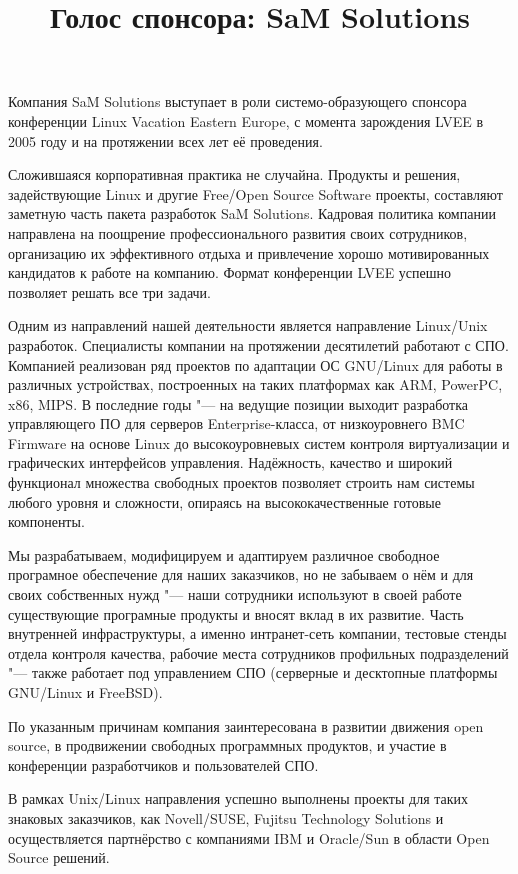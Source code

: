 \documentclass[10pt, a5paper]{article}
\begin{document}
\title{Голос спонсора: SaM Solutions}
\date{}
\maketitle

Компания SaM Solutions выступает в роли системо-образующего спонсора конференции Linux Vacation Eastern Europe, с момента зарождения LVEE в 2005 году и на протяжении всех лет её проведения. 

Сложившаяся корпоративная практика не случайна. Продукты и решения, задействующие Linux и другие Free/Open Source Software проекты, составляют заметную часть пакета разработок SaM Solutions. Кадровая политика компании направлена на поощрение профессионального развития своих сотрудников, организацию их эффективного отдыха и привлечение хорошо мотивированных кандидатов к работе на компанию. Формат конференции LVEE успешно позволяет решать все три задачи. 

Одним из направлений нашей деятельности является направление Linux/Unix разработок. Специалисты компании на протяжении десятилетий работают с СПО. Компанией реализован ряд проектов по адаптации ОС GNU/Linux для работы в различных устройствах, построенных на таких платформах как ARM, PowerPC, x86, MIPS. В последние годы "--- на ведущие позиции выходит разработка управляющего ПО для серверов Enterprise-класса, от низкоуровнего BMC Firmware на основе Linux до высокоуровневых систем контроля виртуализации и графических интерфейсов управления. Надёжность, качество и широкий функционал множества свободных проектов позволяет строить нам системы любого уровня и сложности, опираясь на высококачественные готовые компоненты.

Мы разрабатываем, модифицируем и адаптируем различное свободное програмное обеспечение для наших заказчиков, но не забываем о нём и для своих собственных нужд "--- наши сотрудники используют в своей работе существующие програмные продукты и вносят вклад в их развитие. Часть внутренней инфраструктуры, а именно интранет-сеть компании, тестовые стенды отдела контроля качества, рабочие места сотрудников профильных подразделений "--- также работает под управлением СПО (серверные и десктопные платформы GNU/Linux и FreeBSD).

По указанным причинам компания заинтересована в развитии движения open source, в продвижении свободных программных продуктов, и участие в конференции разработчиков и пользователей СПО.

В рамках Unix/Linux направления успешно выполнены проекты для таких знаковых заказчиков, как  Novell/SUSE, Fujitsu Technology Solutions  и осуществляется партнёрство с компаниями IBM и \linebreak Oracle/Sun в области Open Source решений.
\end{document}
